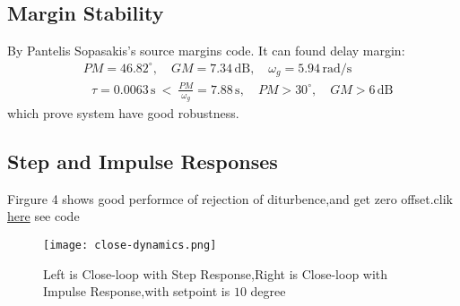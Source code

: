\documentclass[11pt]{article}
\begin{document}
\subsection{Margin Stability}
By Pantelis Sopasakis's source margins code.
It can found delay margin:
\begin{equation*}
\begin{aligned}
& \text{} PM = 46.82^\circ,\quad 
  \text{}  GM = 7.34\,\text{dB},\quad 
  \omega_g = 5.94\,\text{rad/s} \\
& \text{ } \tau = 0.0063\,\text{s}\ <\ 
  \frac{PM}{\omega_g} = 7.88\,\text{s},\quad 
  PM > 30^\circ,\quad GM > 6\,\text{dB} 
\end{aligned}
\end{equation*}
which prove system have good robustness.


\subsection{Step and Impulse Responses}

Firgure 4 shows good performce of rejection of diturbence,and get zero offset.clik \href{https://colab.research.google.com/drive/1uBnb5ELVSpdlkgEdxMvfKnIdxPXh5TGo?usp=sharing}{here} see code

\begin{figure}
  \centering
  \texttt{[image: close-dynamics.png]}
  \caption{Left is Close-loop with Step Response,Right is Close-loop with Impulse Response,with setpoint is $10$ degree}
  \label{fig:example}
\end{figure}
\end{document}
